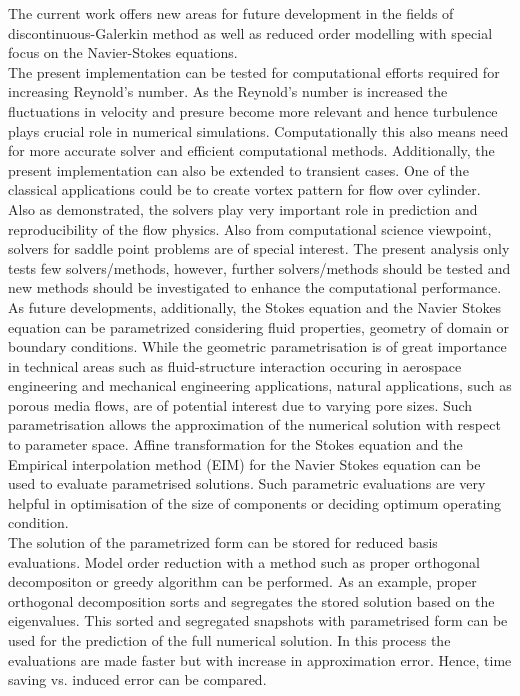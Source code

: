 \documentclass[a4paper,twoside,openright]{book}
\begin{document}
The current work offers new areas for future development in the fields of discontinuous-Galerkin method as well as reduced order modelling with special focus on the Navier-Stokes equations. \\

The present implementation can be tested for computational efforts  required for increasing Reynold's number. As the Reynold's number is increased the fluctuations in velocity and presure become more relevant and hence turbulence plays crucial role in numerical simulations. Computationally this also means need for more accurate solver and efficient computational methods. Additionally, the present implementation can also be extended to transient cases. One of the classical applications could be to create vortex pattern for flow over cylinder.\\

Also as demonstrated, the solvers play very important role in prediction and reproducibility of the flow physics. Also from computational science viewpoint, solvers for saddle point problems are of special interest. The present analysis only tests few solvers/methods, however, further solvers/methods should be tested and new methods should be investigated to enhance the computational performance.\\

As future developments, additionally, the Stokes equation and the Navier Stokes equation can be parametrized considering fluid properties, geometry of domain or boundary conditions. While the geometric parametrisation is of great importance in technical areas such as fluid-structure interaction occuring in aerospace engineering and mechanical engineering applications, natural applications, such as porous media flows, are of potential interest due to varying pore sizes. Such parametrisation allows the approximation of the numerical solution with respect to parameter space. Affine transformation for the Stokes equation and the Empirical interpolation method (EIM) for the Navier Stokes equation can be used to evaluate parametrised solutions. Such parametric evaluations are very helpful in optimisation of the size of components or deciding optimum operating condition. \\

The solution of the parametrized form can be stored for reduced basis evaluations. Model order reduction with a method such as proper orthogonal decompositon or greedy algorithm can be performed. As an example, proper orthogonal decomposition sorts and segregates the stored solution based on the eigenvalues. This sorted and segregated snapshots with parametrised form can be used for the prediction of the full numerical solution. In this process the evaluations are made faster but with increase in approximation error. Hence, time saving vs. induced error can be compared.
\end{document}
